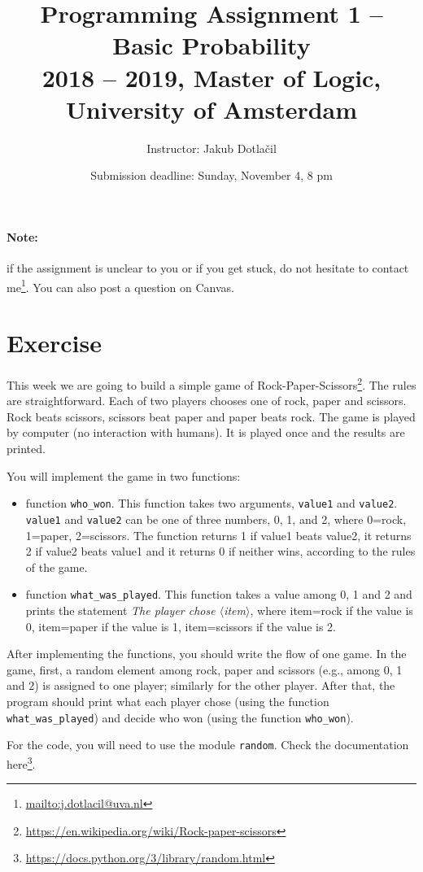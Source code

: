 \documentclass[11pt, a4paper]{article}
\title{Programming Assignment 1 -- Basic Probability\\[2mm]
\large{2018 -- 2019, Master of Logic, University of Amsterdam}}
\author{Instructor: Jakub Dotla\v{c}il}
\date{Submission deadline: Sunday, November 4, 8 pm}
\newcommand{\angles}[1]{$\langle$#1$\rangle$}
\newcommand{\link}[1]{\footnote{\color{blue}\href{#1}{#1}}}
\begin{document}
\maketitle

\paragraph{Note:} if the assignment is unclear to you or if you get stuck, do not hesitate to contact me\link{mailto:j.dotlacil@uva.nl}. You can also post a question on Canvas.

\section{Exercise}
This week we are going to build a simple game of Rock-Paper-Scissors\link{https://en.wikipedia.org/wiki/Rock-paper-scissors}. The rules are straightforward. Each of two players chooses one of rock, paper and scissors. Rock beats scissors, scissors beat paper and paper beats rock. The game is played by computer (no interaction with humans). It is played once and the results are printed.

You will implement the game in two functions:
\begin{itemize}
    \item function \texttt{who\_won}. This function takes two arguments, \texttt{value1} and \texttt{value2}. \texttt{value1} and \texttt{value2} can be one of three numbers, 0, 1, and 2, where 0=rock, 1=paper, 2=scissors. The function returns 1 if value1 beats value2, it returns 2 if value2 beats value1 and it returns 0 if neither wins, according to the rules of the game.
    \item function \texttt{what\_was\_played}. This function takes a value among 0, 1 and 2 and prints the statement \textit{The player chose \angles{item}}, where item=rock if the value is 0, item=paper if the value is 1, item=scissors if the value is 2.
\end{itemize}

After implementing the functions, you should write the flow of one game. In the game, first, a random element among rock, paper and scissors (e.g., among 0, 1 and 2) is assigned to one player; similarly for the other player. After that, the program should print what each player chose (using the function \texttt{what\_was\_played}) and decide who won (using the function \texttt{who\_won}).

For the code, you will need to use the module \texttt{random}. Check the documentation here\link{https://docs.python.org/3/library/random.html}.
\end{document}
